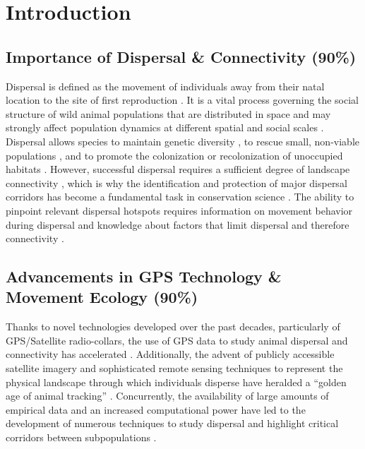 \documentclass[abstract=on,10pt,a4paper,bibliography=totocnumbered]{article}
\begin{document}
\newpage

\onehalfspacing
\tableofcontents
\doublespacing

\newpage
{}

\linenumbers

\section{Introduction}

\subsection{Importance of Dispersal \& Connectivity (90\%)}
Dispersal is defined as the movement of individuals away from their natal
location to the site of first reproduction \cite{Howard.1960}. It is a vital
process governing the social structure of wild animal populations that are
distributed in space \citep{Hanski.1998, Clobert.2012} and may strongly affect
population dynamics at different spatial and social scales \citep{Hanski.1999a,
Clobert.2012}. Dispersal allows species to maintain genetic diversity
\citep{Perrin.1999, Perrin.2000, Frankham.2002, Leigh.2012, Baguette.2013}, to
rescue small, non-viable populations \citep{Brown.1977}, and to promote the
colonization or recolonization of unoccupied habitats \citep{Hanski.1999b,
MacArthur.2001}. However, successful dispersal requires a sufficient degree of
landscape connectivity \citep{Fahrig.2003, Clobert.2012}, which is why the
identification and protection of major dispersal corridors has become a
fundamental task in conservation science \citep{Nathan.2008, Doerr.2011,
Rudnick.2012}. The ability to pinpoint relevant dispersal hotspots requires
information on movement behavior during dispersal and knowledge about factors
that limit dispersal and therefore connectivity \citep{Baguette.2013,
Vasudev.2015}.

\subsection{Advancements in GPS Technology \& Movement Ecology (90\%)}
Thanks to novel technologies developed over the past decades, particularly of
GPS/Satellite radio-collars, the use of GPS data to study animal dispersal and
connectivity has accelerated \citep{Elliot.2014, Jonsson.2016, Williams.2019}.
Additionally, the advent of publicly accessible satellite imagery and
sophisticated remote sensing techniques to represent the physical landscape
through which individuals disperse have heralded a ``golden age of animal
tracking'' \citep{Kays.2015}. Concurrently, the availability of large amounts of
empirical data and an increased computational power have led to the development
of numerous techniques to study dispersal and highlight critical corridors
between subpopulations \citep{Boyce.2002, Fortin.2005, Cushman.2010,
Zeller.2012, Diniz.2020}.
\end{document}
